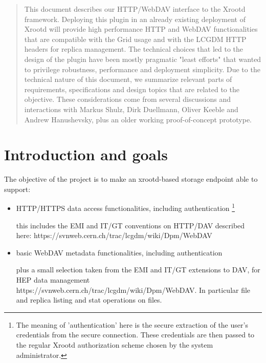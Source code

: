 \documentclass[12pt]{article} %
\begin{document}

\tableofcontents %

\newpage %





\begin{abstract}
This document describes our HTTP/WebDAV interface to the Xrootd framework. Deploying this plugin in an already existing deployment of Xrootd will provide high performance HTTP and WebDAV functionalities that are compatible with the Grid usage and with the LCGDM HTTP headers for replica management. The technical choices that led to the design of the plugin have been mostly pragmatic "least efforts" that wanted to privilege robustness, performance and deployment simplicity. Due to the technical nature of this document, we summarize relevant parts of requirements, specifications and design topics that are related to the objective. These considerations come from several discussions and interactions with Markus Shulz, Dirk Duellmann, Oliver Keeble and Andrew Hanushevsky, plus an older working proof-of-concept prototype.

\end{abstract}






\section{Introduction and goals}
The objective of the project is to make an xrootd-based storage endpoint able to support:

\begin{itemize}

\item HTTP/HTTPS data access functionalities, including authentication \footnote{\label{note1_authn}The meaning of 'authentication' here is the secure extraction of the user’s credentials from the secure connection. These credentials are then passed to the regular Xrootd authorization scheme chosen by the system administrator.}

\subitem this includes the EMI and IT/GT conventions on HTTP/DAV described here: https://svnweb.cern.ch/trac/lcgdm/wiki/Dpm/WebDAV

\item basic WebDAV metadata functionalities, including authentication \footnotemark[\ref{note1_authn}]

\subitem plus a small selection taken from the EMI and IT/GT extensions to DAV, for HEP data management https://svnweb.cern.ch/trac/lcgdm/wiki/Dpm/WebDAV. In particular file and replica listing and stat operations on files.
\end{itemize}
\end{document}
